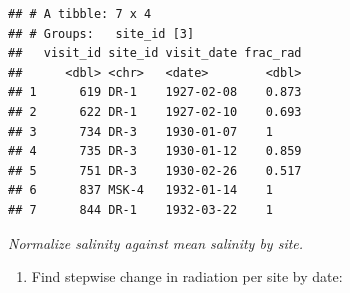\documentclass[]{Nemilov}
\newenvironment{Shaded}{\begin{snugshade}}{\end{snugshade}}
\newcommand{\DataTypeTok}[1]{\textcolor[rgb]{0.13,0.29,0.53}{#1}}
\newcommand{\KeywordTok}[1]{\textcolor[rgb]{0.13,0.29,0.53}{\textbf{#1}}}
\newcommand{\NormalTok}[1]{#1}
\newcommand{\OperatorTok}[1]{\textcolor[rgb]{0.81,0.36,0.00}{\textbf{#1}}}
\newcommand{\StringTok}[1]{\textcolor[rgb]{0.31,0.60,0.02}{#1}}
\providecommand{\tightlist}{%
  \setlength{\itemsep}{0pt}\setlength{\parskip}{0pt}}
\begin{document}
\begin{Shaded}
\end{Shaded}

\begin{verbatim}
## # A tibble: 7 x 4
## # Groups:   site_id [3]
##   visit_id site_id visit_date frac_rad
##      <dbl> <chr>   <date>        <dbl>
## 1      619 DR-1    1927-02-08    0.873
## 2      622 DR-1    1927-02-10    0.693
## 3      734 DR-3    1930-01-07    1    
## 4      735 DR-3    1930-01-12    0.859
## 5      751 DR-3    1930-02-26    0.517
## 6      837 MSK-4   1932-01-14    1    
## 7      844 DR-1    1932-03-22    1
\end{verbatim}

\emph{Normalize salinity against mean salinity by site.}

\begin{enumerate}
\def\labelenumi{\arabic{enumi}.}
\setcounter{enumi}{8}
\tightlist
\item
  Find stepwise change in radiation per site by date:
\end{enumerate}

\begin{Shaded}
\end{Shaded}
\end{document}
